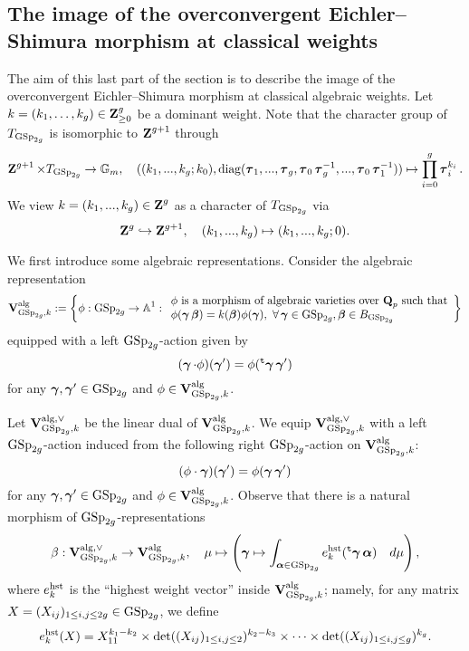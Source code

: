 \subsection{The image of the overconvergent Eichler--Shimura morphism at classical weights}\label{subsection:imageOES}

The aim of this last part of the section is to describe the image of the overconvergent Eichler--Shimura morphism at classical algebraic weights. Let $k=(k_1,\ldots, k_g) \in \Z_{\geq 0}^g$ be a dominant weight. Note that the character group of $T_{\GSp_{2g}}$ is isomorphic to $\Z^{g+1}$ through $$\Z^{g+1}\times T_{\GSp_{2g}}\rightarrow \bbG_m, \quad ((k_1, ..., k_g; k_0), \diag(\bftau_1, ..., \bftau_g, \bftau_0\bftau_g^{-1}, ..., \bftau_0\bftau_1^{-1}))\mapsto \prod_{i=0}^{g}\bftau_i^{k_i}.$$ We view $k=(k_1,..., k_g)\in \Z^g$ as a character of $T_{\GSp_{2g}}$ via $$\Z^g\hookrightarrow\Z^{g+1}, \quad (k_1, ..., k_g)\mapsto (k_1, ..., k_g;0).$$

We first introduce some algebraic representations. Consider the algebraic representation $$\V_{\GSp_{2g}, k}^{\alg}:=\left\{\phi: \GSp_{2g}\rightarrow \bbA^1: \begin{array}{l}
    \phi\text{ is a morphism of algebraic varieties over $\Q_p$ such that}  \\
    \phi(\bfgamma\bfbeta)=k(\bfbeta)\phi(\bfgamma),\,\,\forall \bfgamma\in \GSp_{2g} , \bfbeta\in B_{\GSp_{2g}}  
\end{array}\right\}$$ 
equipped with a left $\GSp_{2g}$-action given by
$$(\bfgamma\cdot\phi)(\bfgamma') = \phi(\trans\bfgamma\bfgamma')$$ for any $\bfgamma, \bfgamma'\in \GSp_{2g}$ and $\phi\in \V_{\GSp_{2g}, k}^{\alg}$. 

Let $\V_{\GSp_{2g}, k}^{\alg, \vee} $ be the linear dual of $\V_{\GSp_{2g}, k}^{\alg}$. We equip $\V_{\GSp_{2g}, k}^{\alg, \vee}$ with a left $\GSp_{2g}$-action induced from the following right $\GSp_{2g}$-action on $\V_{\GSp_{2g}, k}^{\alg}$:
$$(\phi\cdot\bfgamma)(\bfgamma') = \phi(\bfgamma\bfgamma')$$ for any $\bfgamma, \bfgamma'\in \GSp_{2g}$ and $\phi\in \V_{\GSp_{2g}, k}^{\alg}$. Observe that there is a natural morphism of $\GSp_{2g}$-representations 
$$
    \beta:\V_{\GSp_{2g}, k}^{\alg, \vee} \rightarrow \V_{\GSp_{2g}, k}^{\alg}, \quad \mu \mapsto \left(\bfgamma \mapsto \int_{\bfalpha\in \GSp_{2g}}e_{k}^{\hst}(\trans\bfgamma \bfalpha)\quad d\mu\right),
$$where $e_k^{\hst}$ is the ``highest weight vector'' inside $\V_{\GSp_{2g}, k}^{\alg}$; namely, for any matrix $X=(X_{ij})_{1\leq i,j\leq 2g}\in \GSp_{2g}$, we define
$$e^{\hst}_k(X)=X_{11}^{k_1-k_2}\times \det((X_{ij})_{1\leq i,j\leq 2})^{k_2-k_3}\times\cdots \times\det((X_{ij})_{1\leq i,j\leq g})^{k_g}.$$

